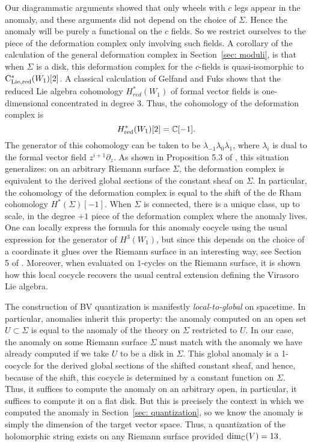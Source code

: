 Our diagrammatic arguments showed that only wheels with $c$ legs appear in the anomaly,
and these arguments did not depend on the choice of $\Sigma$. 
Hence the anomaly will be purely a functional on the $c$ fields.
So we restrict ourselves to the piece of the deformation complex only involving such fields.
A corollary of the calculation of the general deformation complex in Section~\ref{sec: moduli}, 
is that when $\Sigma$ is a disk,
this deformation complex for the $c$-fields is quasi-isomorphic to ${\rm C}_{\rm Lie,red}^*(W_1)[2]$.
A classical calculation of Gelfand and Fuks shows that the reduced Lie algebra cohomology $H_{red}^*(W_1)$ of formal vector fields is one-dimensional concentrated in degree $3$.
Thus, the cohomology of the deformation complex is 
\[
H^*_{\rm red}(W_1)[2] = \mathbb C[-1].
\]
The generator of this cohomology can be taken to be $\lambda_{-1} \lambda_0 \lambda_1$, where $\lambda_i$ is dual to the formal vector field $z^{i+1} \partial_z$. 
As shown in Proposition 5.3 of \cite{BWvir}, this situation generalizes:
on an arbitrary Riemann surface $\Sigma$, the deformation complex is equivalent to the derived global sections of the constant sheaf on $\Sigma$.
In particular, the cohomology of the deformation complex is equal to the shift of the de Rham cohomology $H^*(\Sigma)[-1]$. 
When $\Sigma$ is connected, there is a unique class, up to scale, in the degree $+1$ piece of the deformation complex where the anomaly lives.
One can locally express the formula for this anomaly cocycle using the usual expression for the generator of $H^3(W_1)$, but since this depends on the choice of a coordinate it glues over the Riemann surface in an interesting way, see Section 5 of \cite{BWvir}. 
Moreover, when evaluated on $1$-cycles on the Riemann surface, it is shown how this local cocycle recovers the usual central extension defining the Virasoro Lie algebra. 

The construction of BV quantization is manifestly {\em local-to-global} on spacetime. 
In particular, anomalies inherit this property: the anomaly computed on an open set $U \subset \Sigma$ is equal to the anomaly of the theory on $\Sigma$ restricted to $U$. 
In our case, the anomaly on some Riemann surface $\Sigma$ must match with the anomaly we have already computed if we take $U$ to be a disk in $\Sigma$.
This global anomaly is a 1-cocycle for the derived global sections of the shifted constant sheaf, 
and hence, because of the shift, this cocycle is determined by a constant function on $\Sigma$.
Thus, it suffices to compute the anomaly on an arbitrary open, 
in particular, it suffices to compute it on a flat disk. 
But this is precisely the context in which we computed the anomaly in Section~\ref{sec: quantization}, 
so we know the anomaly is simply the dimension of the target vector space.
Thus, a quantization of the holomorphic string exists on any Riemann surface provided $\dim_{\mathbb C}(V) = 13$. 

